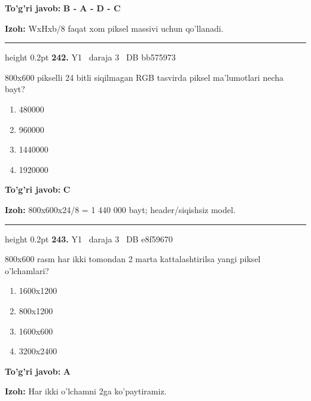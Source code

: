 \documentclass[10pt,a4paper,oneside]{article}
\begin{document}
\begin{tcolorbox}[enhanced,breakable,colback=teal!4,colframe=teal!45!black,boxrule=0.45pt,arc=1.2mm,left=2.8mm,right=2.8mm,top=2mm,bottom=2mm,before skip=2mm,after skip=2mm]
\textbf{\color{teal}To'g'ri javob:} \textbf{B - A - D - C}
\par\smallskip
\textbf{Izoh:} WxHxb/8 faqat xom piksel massivi uchun qo'llanadi.
\end{tcolorbox}
\vspace{2mm}\hrule height 0.2pt \vspace{4mm}
\hypertarget{q242}{\textbf{\color{ink}242.}}  {\color{muted}\scriptsize Y1 \textbullet\ daraja 3 \textbullet\ DB bb575973}
\par
800x600 pikselli 24 bitli siqilmagan RGB tasvirda piksel ma'lumotlari necha bayt?
\begin{enumerate}[label=\Alph*),leftmargin=9mm]
\item 480000
\item 960000
\item 1440000
\item 1920000
\end{enumerate}
\begin{tcolorbox}[enhanced,breakable,colback=teal!4,colframe=teal!45!black,boxrule=0.45pt,arc=1.2mm,left=2.8mm,right=2.8mm,top=2mm,bottom=2mm,before skip=2mm,after skip=2mm]
\textbf{\color{teal}To'g'ri javob:} \textbf{C}
\par\smallskip
\textbf{Izoh:} 800x600x24/8 = 1 440 000 bayt; header/siqishsiz model.
\end{tcolorbox}
\vspace{2mm}\hrule height 0.2pt \vspace{4mm}
\hypertarget{q243}{\textbf{\color{ink}243.}}  {\color{muted}\scriptsize Y1 \textbullet\ daraja 3 \textbullet\ DB e8f59670}
\par
800x600 rasm har ikki tomondan 2 marta kattalashtirilsa yangi piksel o'lchamlari?
\begin{enumerate}[label=\Alph*),leftmargin=9mm]
\item 1600x1200
\item 800x1200
\item 1600x600
\item 3200x2400
\end{enumerate}
\begin{tcolorbox}[enhanced,breakable,colback=teal!4,colframe=teal!45!black,boxrule=0.45pt,arc=1.2mm,left=2.8mm,right=2.8mm,top=2mm,bottom=2mm,before skip=2mm,after skip=2mm]
\textbf{\color{teal}To'g'ri javob:} \textbf{A}
\par\smallskip
\textbf{Izoh:} Har ikki o'lchamni 2ga ko'paytiramiz.
\end{tcolorbox}
\end{document}
